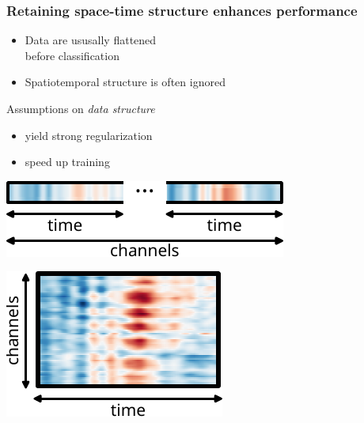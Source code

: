 \documentclass{kul-ulille-beamer}
\begin{document}
\begin{frame}[c]
  \frametitle{Retaining space-time structure enhances performance}
  \begin{minipage}[c]{.5\textwidth}
    \begin{itemize}
      \item Data are ususally flattened \\ before classification
      \item Spatiotemporal structure is often ignored
    \end{itemize}
    \bigskip

    Assumptions on \emph{data structure}
    \begin{itemize}
      \item yield strong regularization
      \item speed up training
    \end{itemize}
  \end{minipage}\hfill%
  \begin{minipage}[c]{.4\textwidth}
    \raggedleft
    \includegraphics[width=.9\textwidth]{figures/bttda/tensor_flat.pdf}
    \bigskip

    \includegraphics[width=\textwidth]{figures/bttda/tensor_st.pdf}

  \end{minipage}
\end{frame}
\end{document}
